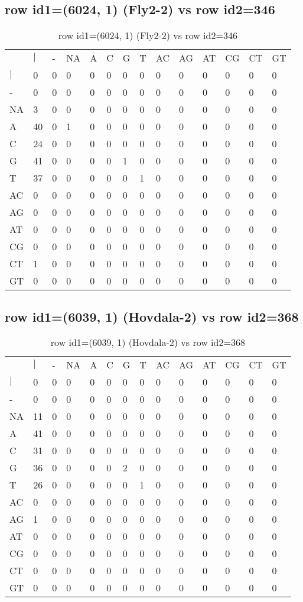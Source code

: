 \subsection{row id1=(6024, 1) (Fly2-2) vs row id2=346}
\begin{center}
\begin{longtable}{|l|l|l|l|l|l|l|l|l|l|l|l|l|l|}
\caption{row id1=(6024, 1) (Fly2-2) vs row id2=346} \label{table_dm16}\\
\hline
\\
\hline
&$|$&-&NA&A&C&G&T&AC&AG&AT&CG&CT&GT\\
$|$&0&0&0&0&0&0&0&0&0&0&0&0&0\\
-&0&0&0&0&0&0&0&0&0&0&0&0&0\\
NA&3&0&0&0&0&0&0&0&0&0&0&0&0\\
A&40&0&1&0&0&0&0&0&0&0&0&0&0\\
C&24&0&0&0&0&0&0&0&0&0&0&0&0\\
G&41&0&0&0&0&1&0&0&0&0&0&0&0\\
T&37&0&0&0&0&0&1&0&0&0&0&0&0\\
AC&0&0&0&0&0&0&0&0&0&0&0&0&0\\
AG&0&0&0&0&0&0&0&0&0&0&0&0&0\\
AT&0&0&0&0&0&0&0&0&0&0&0&0&0\\
CG&0&0&0&0&0&0&0&0&0&0&0&0&0\\
CT&1&0&0&0&0&0&0&0&0&0&0&0&0\\
GT&0&0&0&0&0&0&0&0&0&0&0&0&0\\
\hline
\end{longtable}
\end{center}

\subsection{row id1=(6039, 1) (Hovdala-2) vs row id2=368}
\begin{center}
\begin{longtable}{|l|l|l|l|l|l|l|l|l|l|l|l|l|l|}
\caption{row id1=(6039, 1) (Hovdala-2) vs row id2=368} \label{table_dm18}\\
\hline
\\
\hline
&$|$&-&NA&A&C&G&T&AC&AG&AT&CG&CT&GT\\
$|$&0&0&0&0&0&0&0&0&0&0&0&0&0\\
-&0&0&0&0&0&0&0&0&0&0&0&0&0\\
NA&11&0&0&0&0&0&0&0&0&0&0&0&0\\
A&41&0&0&0&0&0&0&0&0&0&0&0&0\\
C&31&0&0&0&0&0&0&0&0&0&0&0&0\\
G&36&0&0&0&0&2&0&0&0&0&0&0&0\\
T&26&0&0&0&0&0&1&0&0&0&0&0&0\\
AC&0&0&0&0&0&0&0&0&0&0&0&0&0\\
AG&1&0&0&0&0&0&0&0&0&0&0&0&0\\
AT&0&0&0&0&0&0&0&0&0&0&0&0&0\\
CG&0&0&0&0&0&0&0&0&0&0&0&0&0\\
CT&0&0&0&0&0&0&0&0&0&0&0&0&0\\
GT&0&0&0&0&0&0&0&0&0&0&0&0&0\\
\hline
\end{longtable}
\end{center}

